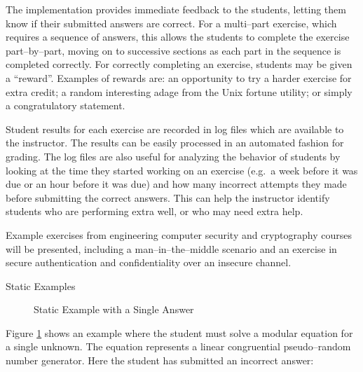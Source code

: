 \documentclass[12pt]{article}
\begin{document}
\vspace{11pt}

The implementation provides immediate feedback to the students, letting them
know if their submitted answers are correct.  
For a multi--part exercise,
which requires a sequence of answers, this allows the students to complete
the exercise part--by--part, moving on to successive sections as each
part in the sequence is completed correctly.  
For correctly completing an exercise, students may be given a ``reward''.
Examples of rewards are: an opportunity to try a harder exercise for extra credit;
a random interesting adage from the Unix fortune utility; or simply
a congratulatory statement.

\vspace{11pt}

Student results for each exercise are recorded in log files which are
available to the instructor.  The results can be easily processed in an
automated fashion for grading.  The log files are also useful for analyzing
the behavior of students by looking at the time they started working on an
exercise (e.g.\ a week before it was due or an hour before it was due) and
how many incorrect attempts they made before submitting the correct answers.
This can help the instructor identify students who are performing extra well,
or who may need extra help.

\vspace{11pt}

Example exercises from engineering computer security and cryptography courses
will be presented, including a man--in--the--middle scenario and an exercise
in secure authentication and confidentiality over an insecure channel.

\vspace{22pt}
Static Examples
\vspace{11pt}

\begin{figure}[ht]
\begin{center}
\caption{Static Example with a Single Answer}
\label{fig:seed}
\end{center}
\end{figure}

Figure \ref{fig:seed} shows an example where the student must solve a
modular equation for a single unknown.  The equation represents a linear
congruential pseudo--random number generator.
Here the student has submitted an incorrect answer:
\end{document}
